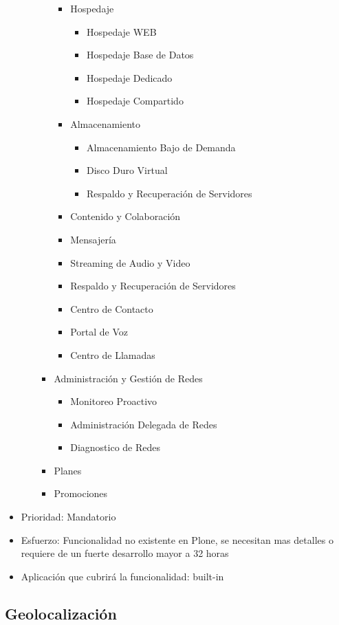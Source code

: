 \documentclass[11pt, letterpaper, oneside, spanish]{scrbook}
\begin{document}
\begin{itemize}
\begin{itemize}
\begin{itemize}
\begin{itemize}
\item Hospedaje
\begin{itemize}
\item Hospedaje WEB
\item Hospedaje Base de Datos
\item Hospedaje Dedicado
\item Hospedaje Compartido
\end{itemize}
\item Almacenamiento
\begin{itemize}
\item Almacenamiento Bajo de Demanda
\item Disco Duro Virtual
\item Respaldo y Recuperación de Servidores
\end{itemize}
\item Contenido y Colaboración
\item Mensajería
\item Streaming de Audio y Video
\item Respaldo y Recuperación de Servidores
\item Centro de Contacto
\item Portal de Voz
\item Centro de Llamadas
\end{itemize}
\item Administración y Gestión de Redes
\begin{itemize}
\item Monitoreo Proactivo
\item Administración Delegada de Redes
\item Diagnostico de Redes
\end{itemize}
\item Planes
\item Promociones
\end{itemize}
\end{itemize}
\item Prioridad: Mandatorio
\item Esfuerzo: Funcionalidad no existente en Plone, se necesitan mas detalles o
  requiere de un fuerte desarrollo mayor a 32 horas
\item Aplicación que cubrirá la funcionalidad:  built-in
\end{itemize}
\subsection{Geolocalización}
\label{sec-2-1-40}
\end{document}
